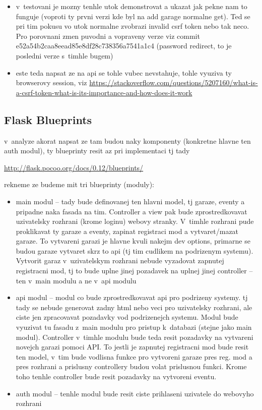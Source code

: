 \begin{itemize}
\item v~testovani je mozny tenhle utok demonstrovat a ukazat jak pekne nam to funguje (voproti ty prvni verzi kde byl na add garage normalne get). Ted se pri tim pokusu vo utok normalne zvobrazi invalid csrf token nebo tak neco. Pro porovnani zmen puvodni a vopraveny verze viz commit e52a54b2caa8eead85e8df28c738356a7541a1c4 (password redirect, to je posledni verze s~timhle bugem)

\item este teda napsat ze na api se tohle vubec nevstahuje, tohle vyuziva ty browserovy session, viz \url{https://stackoverflow.com/questions/5207160/what-is-a-csrf-token-what-is-its-importance-and-how-does-it-work}

\end{itemize}

\subsection{Flask Blueprints}

v~analyze akorat napsat ze tam budou naky komponenty (konkretne hlavne ten auth modul), ty blueprinty resit az pri implementaci tj tady

\url{http://flask.pocoo.org/docs/0.12/blueprints/}

rekneme ze budeme mit tri blueprinty (moduly):

\begin{itemize}
    \item main modul -- tady bude definovanej ten hlavni model, tj garaze, eventy a pripadne naka fasada na tim. Controller a view pak bude zprostredkovavat uzivatelsky rozhrani (krome loginu) webovy stranky. V~timhle rozhrani pude proklikavat ty garaze a eventy, zapinat registraci mod a vytvaret/mazat garaze. To vytvareni garazi je hlavne kvuli nakejm dev options, primarne se budou garaze vytvaret skrz to api (tj tim cudlikem na podrizenym systemu). Vytvorit garaz v~uzivatelskym rozhrani nebude vyzadovat zapnutej registracni mod, tj to bude uplne jinej pozadavek na uplnej jinej controller -- ten v~main modulu a ne v~api modulu
    \item api modul -- modul co bude zprostredkovavat api pro podrizeny systemy. tj tady se nebude generovat zadny html nebo veci pro uzivatelsky rozhrani, ale ciste jen zpracovavat pozadavky vod podrizenejch systemu. Modul bude vyuzivat tu fasadu z~main modulu pro pristup k~databazi (stejne jako main modul). Controller v~timhle modulu bude teda resit pozadavky na vytvareni novejch garazi pomoci API. To jestli je zapnutej registracni mod bude resit ten model, v~tim bude vodlisna funkce pro vytvoreni garaze pres reg. mod a pres rozhrani a prislusny controllery budou volat prislusnou funkci. Krome toho tenhle controller bude resit pozadavky na vytvoreni eventu.
    \item auth modul -- tenhle modul bude resit ciste prihlaseni uzivatele do webovyho rozhrani
\end{itemize}

